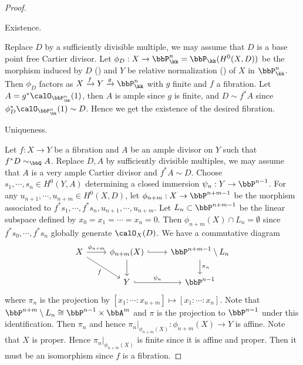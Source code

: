   \begin{proof}
    \hspace{1em}

    \begin{step}
      Existence.
    \end{step}

    Replace $D$ by a sufficiently divisible multiple, we may assume that $D$ is a base point free Cartier divisor.
    Let $\phi_D: X \to \bbP_\kk^n = \bbP_\kk(H^0(X,D))$ be the morphism induced by $D$ (\cite[Chapter II, Theorem 7.1]{Har77}) and $Y$ be relative normalization (\Yang{}) of $X$ in $\bbP_\kk^n$.
    Then $\phi_D$ factors as $X \xrightarrow{f} Y \xrightarrow{g} \bbP_\kk^n$ with $g$ finite and $f$ a fibration.
    Let $A = g^* \calO_{\bbP_\kk^n}(1)$, then $A$ is ample since $g$ is finite, and $D \sim f^* A$ since $\phi_D^* \calO_{\bbP_\kk^n}(1) \sim D$.
    Hence we get the existence of the desired fibration.

    \begin{step}
      Uniqueness.
    \end{step}

    Let $f:X \to Y$ be a fibration and $A$ be an ample divisor on $Y$ such that $f^*D \sim_\bbQ A$.
    Replace $D,A$ by sufficiently divisible multiples, we may assume that $A$ is a very ample Cartier divisor and $f^*A \sim D$.
    Choose $s_1,\cdots, s_n \in H^0(Y,A)$ determining a closed immersion $\psi_n: Y \to \bbP^{n-1}$.
    For any $u_{n+1},\cdots,u_{n+m} \in H^0(X,D)$, let $\phi_{n+m}: X \to \bbP^{n+m-1}$ be the morphism associated to $f^*s_1,\cdots,f^*s_{n},u_{n+1},\cdots,u_{n+m}$.
    Let $L_n \subset \bbP^{n+m-1}$ be the linear subspace defined by $x_0=x_1=\cdots =x_n = 0$.
    Then $\phi_{n+m}(X) \cap L_n = \emptyset$ since $f^*s_0,\cdots,f^*s_{n}$ globally generate $\calO_X(D)$.
    We have a commutative diagram
    \[ \begin{tikzcd}
      X \ar[r,"\phi_{n+m}"] \ar[dr,"f"'] &\phi_{n+m}(X) \ar[d] \ar[r, hook] & \bbP^{n+m-1} \setminus L_n \ar[d, "\pi_n"] \\
        & Y \ar[r, "\psi_n", hook] & \bbP^{n-1}
    \end{tikzcd} \]
    where $\pi_n$ is the projection by $[x_1:\cdots:x_{n+m}] \mapsto [x_1:\cdots:x_n]$.
    Note that $\bbP^{n+m} \setminus L_n \cong \bbP^{n-1} \times \bbA^m$ and $\pi$ is the projection to $\bbP^{n-1}$ under this identification.
    Then $\pi_n$ and hence $\pi_n|_{\phi_{n+m}(X)}:\phi_{n+m}(X) \to Y$ is affine.
    Note that $X$ is proper.
    Hence $\pi_n|_{\phi_{n+m}(X)}$ is finite since it is affine and proper.
    Then it must be an isomorphism since $f$ is a fibration.


\end{proof}
